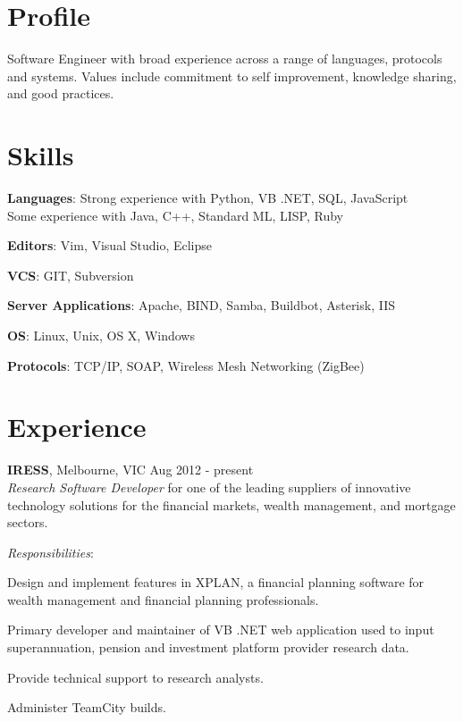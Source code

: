 \documentclass[line,margin]{res}
\begin{document}
    \address{ablack@fastmail.net}
    \address{0401 868 343}

    \begin{resume}
        \section{Profile}
        Software Engineer with broad experience across a range of languages, protocols and systems.
        Values include commitment to self improvement, knowledge sharing, and good practices.
            
        \section{Skills}
        \begin{list}{}{\leftmargin=1em \itemsep=-2pt}
            \item{\textbf{Languages}: Strong experience with Python, VB .NET, SQL, JavaScript\\
                Some experience with Java, C++, Standard ML, LISP, Ruby}
            \item{\textbf{Editors}: Vim, Visual Studio, Eclipse}
            \item{\textbf{VCS}: GIT, Subversion}
            \item{\textbf{Server Applications}: Apache, BIND, Samba, Buildbot, Asterisk, IIS}
            \item{\textbf{OS}: Linux, Unix, OS X, Windows}
            \item{\textbf{Protocols}: TCP/IP, SOAP, Wireless Mesh Networking (ZigBee)}
        \end{list}

        \section{Experience}
        \textbf{IRESS}, Melbourne, VIC \hfill Aug 2012 - present \\
        \textit{Research Software Developer} for one of the leading suppliers of innovative technology
        solutions for the financial markets, wealth management, and mortgage sectors.

        \textit{Responsibilities}:
        \begin{list}{}{\leftmargin=1em \itemsep=-2pt}
            \item{Design and implement features in XPLAN, a financial planning software for wealth
            management and financial planning professionals.}
            \item{Primary developer and maintainer of VB .NET web application used to input superannuation,
            pension and investment platform provider research data.}
            \item{Provide technical support to research analysts.}
            \item{Administer TeamCity builds.}
        \end{list}


\end{resume}
\end{document}
